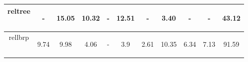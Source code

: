 \documentclass{article}
\begin{document}
\begin{table}[H]
\begin{center}
\begin{tabular}{|c|c|c|c|c|c|c|c|c|c|c|}
				    reltree & \begin{footnotesize}-\end{footnotesize} & \begin{footnotesize}15.05\end{footnotesize} & \begin{footnotesize}10.32\end{footnotesize} & \begin{footnotesize}-\end{footnotesize} & \begin{footnotesize}12.51\end{footnotesize} & \begin{footnotesize}-\end{footnotesize} & \begin{footnotesize}3.40\end{footnotesize} & \begin{footnotesize}-\end{footnotesize} & \begin{footnotesize}-\end{footnotesize} & \begin{footnotesize}43.12\end{footnotesize}\\ \hline
   				    rellbrp & \begin{footnotesize}9.74\end{footnotesize} & \begin{footnotesize}9.98\end{footnotesize} & \begin{footnotesize}4.06\end{footnotesize} & \begin{footnotesize}-\end{footnotesize} & \begin{footnotesize}3.9\end{footnotesize} & \begin{footnotesize}2.61\end{footnotesize} & \begin{footnotesize}10.35\end{footnotesize} & \begin{footnotesize}6.34\end{footnotesize} & \begin{footnotesize}7.13\end{footnotesize} & \begin{footnotesize}91.59\end{footnotesize}\\ \hline

\end{tabular}
\end{center}
\end{table}
\end{document}
